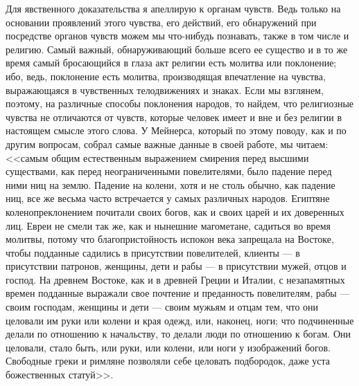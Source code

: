 \documentclass[12pt]{article}
\begin{document}
Для явственного доказательства я апеллирую к органам чувств. Ведь только на основании проявлений этого чувства, его действий, его обнаружений при посредстве органов чувств можем мы что-нибудь познавать, также в том числе и религию. Самый важный, обнаруживающий больше всего ее существо и в то же время самый бросающийся в глаза акт религии есть молитва или поклонение; ибо, ведь, поклонение есть молитва, производящая впечатление на чувства, выражающаяся в чувственных телодвижениях и знаках. Если мы взглянем, поэтому, на различные способы поклонения народов, то найдем, что религиозные чувства не отличаются от чувств, которые человек имеет и вне и без религии в настоящем смысле этого слова. У Мейнерса, который по этому поводу, как и по другим вопросам, собрал самые важные данные в своей работе, мы читаем: <<самым общим естественным выражением смирения перед высшими существами, как перед неограниченными повелителями, было падение перед ними ниц на землю. Падение на колени, хотя и не столь обычно, как падение ниц, все же весьма часто встречается у самых различных народов. Египтяне коленопреклонением почитали своих богов, как и своих царей и их доверенных лиц. Евреи не смели так же, как и нынешние магометане, садиться во время молитвы, потому что благопристойность испокон века запрещала на Востоке, чтобы подданные садились в присутствии повелителей, клиенты --- в присутствии патронов, женщины, дети и рабы --- в присутствии мужей, отцов и господ. На древнем Востоке, как и в древней Греции и Италии, с незапамятных времен подданные выражали свое почтение и преданность повелителям, рабы --- своим господам, женщины и дети --- своим мужьям и отцам тем, что они целовали им руки или колени и края одежд, или, наконец, ноги; что подчиненные делали по отношению к начальству, то делали люди по отношению к богам. Они целовали, стало быть, или руки, или колени, или ноги у изображений богов. Свободные греки и римляне позволяли себе целовать подбородок, даже уста божественных статуй>>. 
\end{document}
